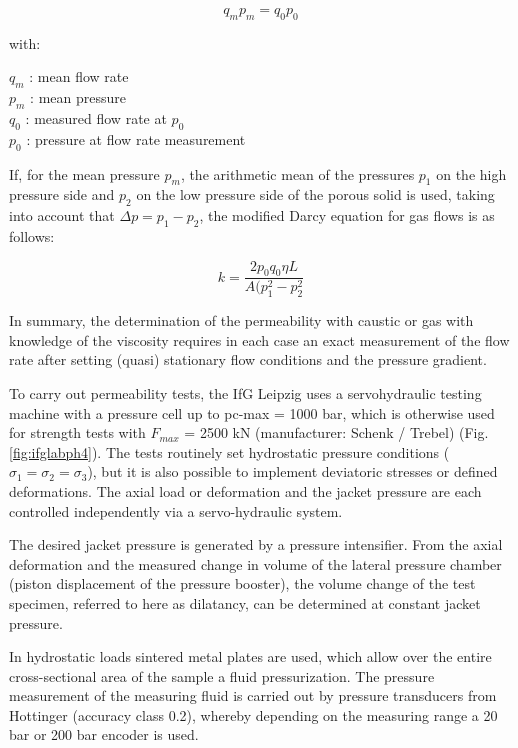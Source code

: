 \begin{equation}
q_m p_m = q_0 p_0
\end{equation}

with:

$q_m$ : mean flow rate \\
$p_m$ : mean pressure \\
$q_0$ : measured flow rate at $p_0$ \\
$p_0$ : pressure at flow rate measurement 

If, for the mean pressure $p_m$, the arithmetic mean of the pressures $p_1$ on the high pressure side and $p_2$ on the low 
pressure side of the porous solid is used, taking into account that $\Delta p = p_1 - p_2$, the modified Darcy equation for 
gas flows is as follows:

\begin{equation}
k = \frac{2p_0q_0\eta L}{A(p_1^2-p_2^2}
\end{equation}

In summary, the determination of the permeability with caustic or gas with knowledge of the viscosity requires in each 
case an exact measurement of the flow rate after setting (quasi) stationary flow conditions and the pressure gradient.

To carry out permeability tests, the IfG Leipzig uses a servohydraulic testing machine with a pressure cell up to pc-max = 1000 bar, 
which is otherwise used for strength tests with $F_{max}$ = 2500 kN (manufacturer: Schenk / Trebel) (Fig. \ref{fig:ifglabph4}). The tests 
routinely set hydrostatic pressure conditions ($\sigma_1 = \sigma_2 = \sigma_3$), but it is also possible to implement 
deviatoric stresses or defined deformations. The axial load or deformation and the jacket pressure are each controlled 
independently via a servo-hydraulic system. 

The desired jacket pressure is generated by a pressure intensifier. From the axial deformation and the measured change in 
volume of the lateral pressure chamber (piston displacement of the pressure booster), the volume change of the test specimen, 
referred to here as dilatancy, can be determined at constant jacket pressure.

In hydrostatic loads sintered metal plates are used, which allow over the entire cross-sectional area of the sample a fluid 
pressurization. The pressure measurement of the measuring fluid is carried out by pressure transducers from Hottinger 
(accuracy class 0.2), whereby depending on the measuring range a 20 bar or 200 bar encoder is used.


